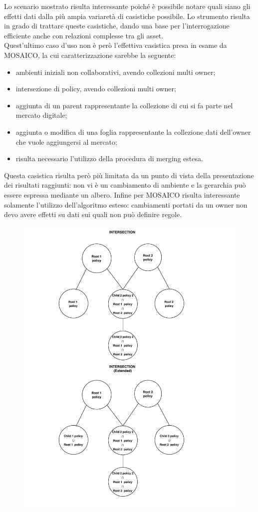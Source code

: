 \documentclass[12pt,a4paper,twoside]{book}
\begin{document}
Lo scenario mostrato risulta interessante poiché è possibile notare quali siano gli effetti dati dalla più ampia variaretà di casistiche possibile. Lo strumento risulta in grado di trattare queste casistiche, dando una base per l'interrogazione efficiente anche con relazioni complesse tra gli asset. \\
Quest'ultimo caso d'uso non è però l'effettiva casistica presa in esame da MOSAICO, la cui caratterizzazione sarebbe la seguente:
\begin{itemize}
\item ambienti iniziali non collaborativi, avendo collezioni multi owner;
\item intersezione di policy, avendo collezioni multi owner;
\item aggiunta di un parent rappresentante la collezione di cui si fa parte nel mercato digitale;
\item aggiunta o modifica di una foglia rappresentante la collezione dati dell'owner che vuole aggiungersi al mercato;
\item risulta necessario l'utilizzo della procedura di merging estesa.
\end{itemize}
Questa casistica risulta però più limitata da un punto di vista della presentazione dei risultati raggiunti: non vi è un cambiamento di ambiente e la gerarchia può essere espressa mediante un albero. Infine per MOSAICO risulta interessante solamente l'utilizzo dell'algoritmo esteso: cambiamenti portati da un owner non devo avere effetti su dati sui quali non può definire regole.
\begin{figure}[H]
\centering
\includegraphics[scale=.80]{../immagini/DAGExampleRES.pdf}
\caption{}
\label{DAGResult}
\end{figure}
\end{document}
